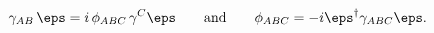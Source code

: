 \begin{equation}
\gamma_{AB}\, \eps = i\,\phi_{ABC} \,\gamma ^C \eps \qquad \mbox{and} \qquad
\phi_{ABC} = -i\eps^{\dagger} \gamma_{ABC} \eps. \label{7dga} 
\end{equation}

